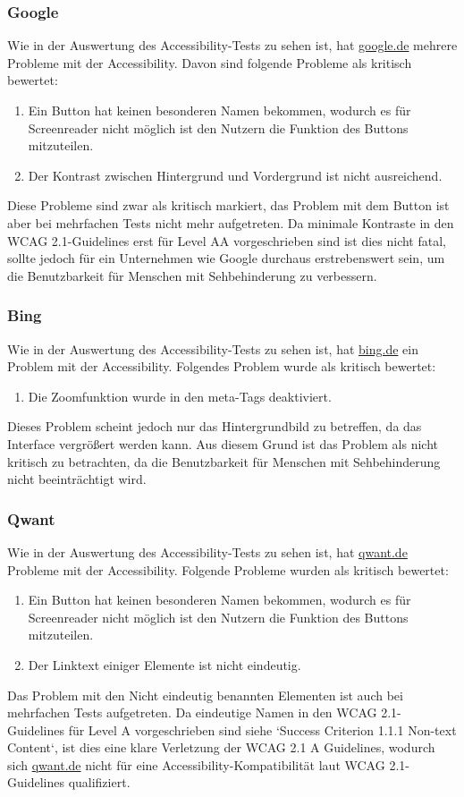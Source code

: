 \subsubsection{Google}\label{subsubsec:google}
Wie in der Auswertung des Accessibility-Tests zu sehen ist, hat \url{google.de} mehrere Probleme mit der Accessibility.
Davon sind folgende Probleme als kritisch bewertet:
\begin{enumerate}
    \item Ein Button hat keinen besonderen Namen bekommen, wodurch es für Screenreader nicht möglich ist den Nutzern die Funktion des Buttons mitzuteilen.
    \item Der Kontrast zwischen Hintergrund und Vordergrund ist nicht ausreichend.
\end{enumerate}
Diese Probleme sind zwar als kritisch markiert, das Problem mit dem Button ist aber bei mehrfachen Tests nicht mehr aufgetreten.
Da minimale Kontraste in den WCAG 2.1-Guidelines erst für Level AA vorgeschrieben sind ist dies nicht fatal, sollte jedoch für ein Unternehmen wie Google durchaus erstrebenswert sein,
um die Benutzbarkeit für Menschen mit Sehbehinderung zu verbessern.

\subsubsection{Bing}\label{subsubsec:bing}
Wie in der Auswertung des Accessibility-Tests zu sehen ist, hat \url{bing.de} ein Problem mit der Accessibility.
Folgendes Problem wurde als kritisch bewertet:
\begin{enumerate}
    \item Die Zoomfunktion wurde in den meta-Tags deaktiviert.
\end{enumerate}
Dieses Problem scheint jedoch nur das Hintergrundbild zu betreffen, da das Interface vergrößert werden kann.
Aus diesem Grund ist das Problem als nicht kritisch zu betrachten, da die Benutzbarkeit für Menschen mit Sehbehinderung nicht beeinträchtigt wird.

\subsubsection{Qwant}\label{subsubsec:qwant}
Wie in der Auswertung des Accessibility-Tests zu sehen ist, hat \url{qwant.de} Probleme mit der Accessibility.
Folgende Probleme wurden als kritisch bewertet:
\begin{enumerate}
    \item Ein Button hat keinen besonderen Namen bekommen, wodurch es für Screenreader nicht möglich ist den Nutzern die Funktion des Buttons mitzuteilen.
    \item Der Linktext einiger Elemente ist nicht eindeutig.
\end{enumerate}
Das Problem mit den Nicht eindeutig benannten Elementen ist auch bei mehrfachen Tests aufgetreten.
Da eindeutige Namen in den WCAG 2.1-Guidelines für Level A vorgeschrieben sind siehe `Success Criterion 1.1.1 Non-text Content`\autocite{WCAG21},
ist dies eine klare Verletzung der WCAG 2.1 A Guidelines, wodurch sich \url{qwant.de} nicht für eine Accessibility-Kompatibilität laut WCAG 2.1-Guidelines qualifiziert.

